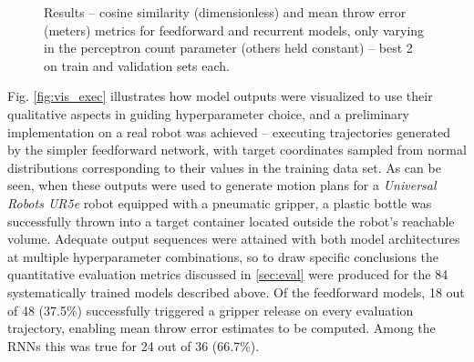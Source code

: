 \documentclass{article}
\begin{document}
\begin{figure}[!t]
	\centering
	\caption{Results -- cosine similarity (dimensionless) and mean throw error (meters) metrics for feedforward and recurrent models, only varying in the perceptron count parameter (others held constant) -- best 2 on train and validation sets each.}
	\label{fig:ind_rnn_naive}
\end{figure}

Fig. \ref{fig:vis_exec} illustrates how model outputs were visualized to use their qualitative aspects in guiding hyperparameter choice, and a preliminary implementation on a real robot was achieved -- executing trajectories generated by the simpler feedforward network, with target coordinates sampled from normal distributions corresponding to their values in the training data set. As can be seen, when these outputs were used to generate motion plans for a \emph{Universal Robots UR5e} robot equipped with a pneumatic gripper, a plastic bottle was successfully thrown into a target container located outside the robot's reachable volume. Adequate output sequences were attained with both model architectures at multiple hyperparameter combinations, so to draw specific conclusions the quantitative evaluation metrics discussed in \ref{sec:eval} were produced for the 84 systematically trained models described above. Of the feedforward models, 18 out of 48 (37.5\%) successfully triggered a gripper release on every evaluation trajectory, enabling mean throw error estimates to be computed. Among the RNNs this was true for 24 out of 36 (66.7\%).
\end{document}
